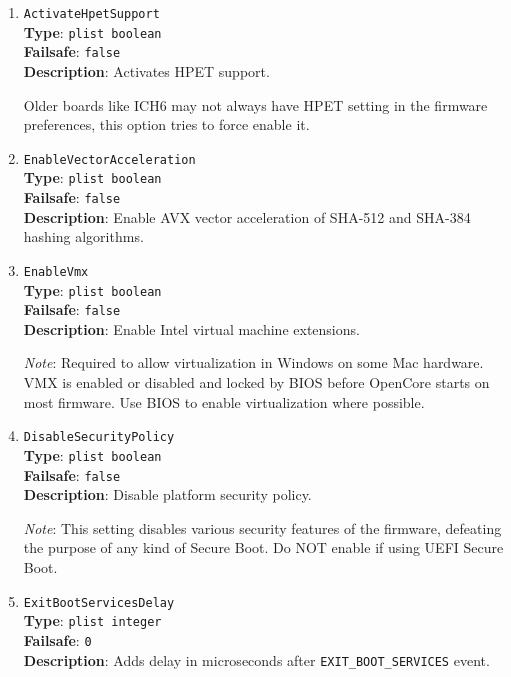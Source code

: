 \documentclass[]{article}
\begin{document}
\begin{enumerate}

\item
  \texttt{ActivateHpetSupport}\\
  \textbf{Type}: \texttt{plist\ boolean}\\
  \textbf{Failsafe}: \texttt{false}\\
  \textbf{Description}: Activates HPET support.

  Older boards like ICH6 may not always have HPET setting in the firmware preferences,
  this option tries to force enable it.

  \item
  \texttt{EnableVectorAcceleration}\\
  \textbf{Type}: \texttt{plist\ boolean}\\
  \textbf{Failsafe}: \texttt{false}\\
  \textbf{Description}: Enable AVX vector acceleration of SHA-512 and SHA-384 hashing algorithms.

  \item
  \texttt{EnableVmx}\\
  \textbf{Type}: \texttt{plist\ boolean}\\
  \textbf{Failsafe}: \texttt{false}\\
  \textbf{Description}: Enable Intel virtual machine extensions.

  \emph{Note}: Required to allow virtualization in Windows on some Mac hardware. VMX
  is enabled or disabled and locked by BIOS before OpenCore starts on most
  firmware. Use BIOS to enable virtualization where possible.

  \item
  \texttt{DisableSecurityPolicy}\\
  \textbf{Type}: \texttt{plist\ boolean}\\
  \textbf{Failsafe}: \texttt{false}\\
  \textbf{Description}: Disable platform security policy.

  \emph{Note}: This setting disables various security features of the firmware,
  defeating the purpose of any kind of Secure Boot. Do NOT enable if using
  UEFI Secure Boot.

\item
  \texttt{ExitBootServicesDelay}\\
  \textbf{Type}: \texttt{plist\ integer}\\
  \textbf{Failsafe}: \texttt{0}\\
  \textbf{Description}: Adds delay in microseconds after \texttt{EXIT\_BOOT\_SERVICES}
  event.


\end{enumerate}
\end{document}
